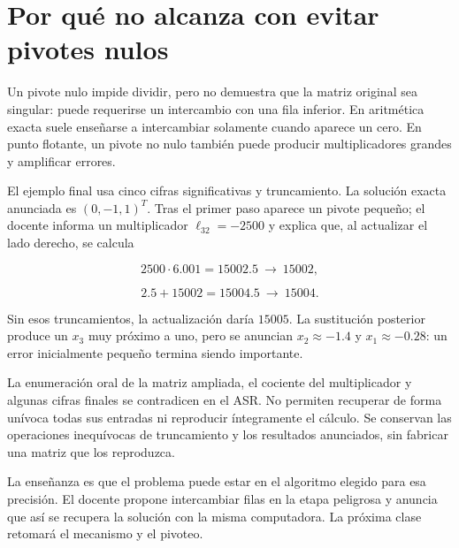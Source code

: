 \documentclass[12pt,a4paper]{article}
\begin{document}
\section{Por qué no alcanza con evitar pivotes nulos}

Un pivote nulo impide dividir, pero no demuestra que la matriz original sea singular: puede requerirse un intercambio con una fila inferior. En aritmética exacta suele enseñarse a intercambiar solamente cuando aparece un cero. En punto flotante, un pivote no nulo también puede producir multiplicadores grandes y amplificar errores.

El ejemplo final usa cinco cifras significativas y truncamiento. La solución exacta anunciada es $(0,-1,1)^T$. Tras el primer paso aparece un pivote pequeño; el docente informa un multiplicador $\ell_{32}=-2500$ y explica que, al actualizar el lado derecho, se calcula

\[
2500\cdot6.001=15002.5
\ \longrightarrow\ 15002,
\]

\[
2.5+15002=15004.5
\ \longrightarrow\ 15004.
\]

Sin esos truncamientos, la actualización daría $15005$. La sustitución posterior produce un $x_3$ muy próximo a uno, pero se anuncian $x_2\approx-1.4$ y $x_1\approx-0.28$: un error inicialmente pequeño termina siendo importante.

\begin{notebox}
La enumeración oral de la matriz ampliada, el cociente del multiplicador y algunas cifras finales se contradicen en el ASR. No permiten recuperar de forma unívoca todas sus entradas ni reproducir íntegramente el cálculo. Se conservan las operaciones inequívocas de truncamiento y los resultados anunciados, sin fabricar una matriz que los reproduzca.
\end{notebox}

La enseñanza es que el problema puede estar en el algoritmo elegido para esa precisión. El docente propone intercambiar filas en la etapa peligrosa y anuncia que así se recupera la solución con la misma computadora. La próxima clase retomará el mecanismo y el pivoteo.
\end{document}
